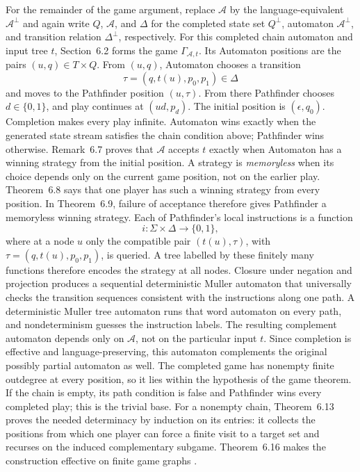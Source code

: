 For the remainder of the game argument, replace \(\mathcal A\) by the
language-equivalent \(\mathcal A^\bot\) and again write \(Q\), \(\mathcal A\),
and \(\Delta\) for the completed state set \(Q^\bot\), automaton
\(\mathcal A^\bot\), and transition relation \(\Delta^\bot\), respectively.
For this completed chain automaton and input tree \(t\), Section~6.2 forms the
game \(\Gamma_{\mathcal A,t}\).  Its Automaton positions are the pairs
\((u,q)\in T\times Q\).  From \((u,q)\), Automaton chooses a transition
\[
 \tau=(q,t(u),p_0,p_1)\in\Delta
\]
and moves to the Pathfinder position \((u,\tau)\).  From there Pathfinder
chooses \(d\in\{0,1\}\), and play continues at \((ud,p_d)\).  The initial
position is \((\epsilon,q_0)\).  Completion makes every play infinite.
Automaton wins exactly when the generated state stream satisfies the chain
condition above; Pathfinder wins otherwise.  Remark~6.7 proves that
\(\mathcal A\) accepts \(t\) exactly
when Automaton has a winning strategy from the initial position.  A strategy
is \emph{memoryless} when its choice depends only on the current game position,
not on the earlier play.  Theorem~6.8 says that one player has such a winning
strategy from every position.  In Theorem~6.9, failure of acceptance therefore
gives Pathfinder a memoryless winning strategy.  Each of Pathfinder's local
instructions is a function
\[
 i:\Sigma\times\Delta\longrightarrow\{0,1\},
\]
where at a node \(u\) only the compatible pair \((t(u),\tau)\), with
\(\tau=(q,t(u),p_0,p_1)\), is queried.  A tree labelled by these finitely many
functions therefore encodes the strategy at all nodes.  Closure under negation
and projection produces a sequential
deterministic Muller automaton that universally checks the transition sequences
consistent with the instructions along one path.  A deterministic Muller tree
automaton runs that word automaton on every path, and nondeterminism guesses the
instruction labels.  The resulting complement automaton depends
only on \(\mathcal A\), not on the particular input \(t\).  Since completion is
effective and language-preserving, this automaton complements the original
possibly partial automaton as well.  The completed game has nonempty finite
outdegree at every position, so it lies within the hypothesis of
the game theorem.  If the chain is empty, its path condition is false and
Pathfinder wins every completed play; this is the trivial base.  For a
nonempty chain, Theorem~6.13 proves the needed determinacy by induction on its
entries: it collects the positions from which one player can force a finite
visit to a target set and recurses on the induced complementary subgame.
Theorem~6.16 makes the construction effective on finite game graphs
\cite[pp.~47--55]{Thomas1996Report}.

